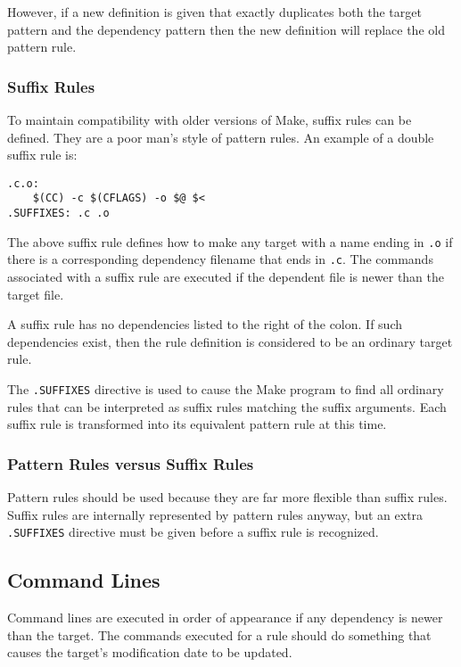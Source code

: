 However, if a new definition is given that exactly duplicates both the
target pattern and the dependency pattern then the new definition will
replace the old pattern rule.

\subsubsection{Suffix Rules}

To maintain compatibility with older versions of Make, suffix rules can be
defined.  They are a poor man's style of pattern rules.  An example of a
double suffix rule is:

\begin{verbatim}
.c.o:
    $(CC) -c $(CFLAGS) -o $@ $<
.SUFFIXES: .c .o
\end{verbatim}

The above suffix rule defines how to make any target with a name ending
in {\tt .o} if there is a corresponding dependency filename that ends in
{\tt .c}.  The commands associated with a suffix rule are executed if the
dependent file is newer than the target file.

A suffix rule has no dependencies listed to the right of the colon.  If
such dependencies exist, then the rule definition is considered to be an
ordinary target rule.

The {\tt .SUFFIXES} directive is used to cause the Make program to find all
ordinary rules that can be interpreted as suffix rules matching the suffix
arguments.  Each suffix rule is transformed into its equivalent pattern
rule at this time.

\subsubsection{Pattern Rules versus Suffix Rules}

Pattern rules should be used because they are far more flexible than suffix
rules.  Suffix rules are internally represented by pattern rules anyway,
but an extra {\tt .SUFFIXES} directive must be given before a suffix rule
is recognized.

\subsection{Command Lines}

Command lines are executed in order of appearance if any dependency is
newer than the target.  The commands executed for a rule should do
something that causes the target's modification date to be updated.

